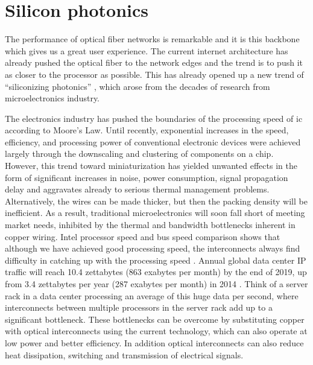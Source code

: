 \documentclass[../report.tex]{subfiles}
\begin{document}
	\section{Silicon photonics}
The performance of optical fiber networks is remarkable and it is this backbone which gives us a great user experience. The current internet architecture has already pushed the optical fiber to the network edges and the trend is to push it as closer to the processor as possible. This has already opened up a new trend of “siliconizing photonics” \cite{silicon_photonics}, which arose from the decades of research from microelectronics industry.\par 
The electronics industry has pushed the boundaries of the processing speed of \gls{ic} according to Moore’s Law. Until recently, exponential increases in the speed, efficiency, and processing power of conventional electronic devices were achieved largely through the downscaling and clustering of components on a chip. However, this trend toward miniaturization has yielded unwanted effects in the form of significant increases in noise, power consumption, signal propagation delay and aggravates already to serious thermal management problems. Alternatively, the wires can be made thicker, but then the packing density will be inefficient. As a result, traditional microelectronics will soon fall short of meeting market needs, inhibited by the thermal and bandwidth bottlenecks inherent in copper wiring. Intel processor speed and bus speed comparison shows that although we have achieved good processing speed, the interconnects always find difficulty in catching up with the processing speed \cite{intel_proc_compare}. Annual global data center IP traffic will reach 10.4 zettabytes (863 exabytes per month) by the end of 2019, up from 3.4 zettabytes per year (287 exabytes per month) in 2014 \cite{cisco_forecast_2019}. Think of a server rack in a data center processing an average of this huge data per second, where interconnects between multiple processors in the server rack add up to a significant bottleneck. These bottlenecks can be overcome by substituting copper with optical interconnects using the current technology, which can also operate at low power and better efficiency. In addition optical interconnects can also reduce heat dissipation, switching and transmission of electrical signals.\par
\end{document}

